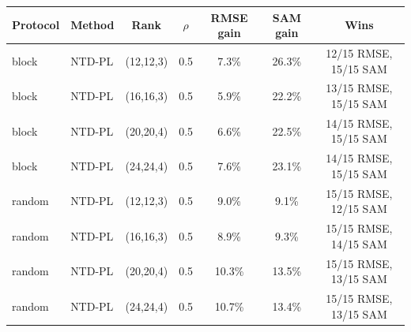 \begin{tabular}{@{}l l c c c c c@{}}
\toprule
Protocol & Method & Rank & $\rho$ & RMSE gain & SAM gain & Wins\\
\midrule
block & NTD-PL & (12,12,3) & 0.5 & 7.3\% & 26.3\% & 12/15 RMSE, 15/15 SAM\\
block & NTD-PL & (16,16,3) & 0.5 & 5.9\% & 22.2\% & 13/15 RMSE, 15/15 SAM\\
block & NTD-PL & (20,20,4) & 0.5 & 6.6\% & 22.5\% & 14/15 RMSE, 15/15 SAM\\
block & NTD-PL & (24,24,4) & 0.5 & 7.6\% & 23.1\% & 14/15 RMSE, 15/15 SAM\\
random & NTD-PL & (12,12,3) & 0.5 & 9.0\% & 9.1\% & 15/15 RMSE, 12/15 SAM\\
random & NTD-PL & (16,16,3) & 0.5 & 8.9\% & 9.3\% & 15/15 RMSE, 14/15 SAM\\
random & NTD-PL & (20,20,4) & 0.5 & 10.3\% & 13.5\% & 15/15 RMSE, 13/15 SAM\\
random & NTD-PL & (24,24,4) & 0.5 & 10.7\% & 13.4\% & 15/15 RMSE, 13/15 SAM\\
\bottomrule
\end{tabular}
